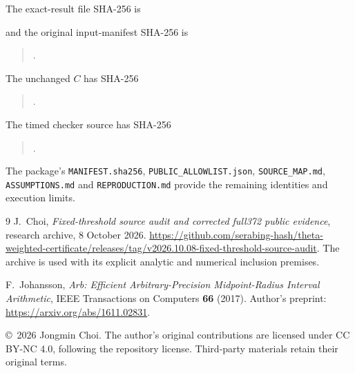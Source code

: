 \documentclass[11pt,a4paper]{article}
\theoremstyle{definition}
\theoremstyle{remark}
\numberwithin{equation}{section}
\begin{document}
The exact-result file SHA-256 is
\begin{quote}\small{}\end{quote}
and the original input-manifest SHA-256 is
\begin{quote}\small{}.\end{quote}
The unchanged \(C\) has SHA-256
\begin{quote}\small{}.\end{quote}
The timed checker source has SHA-256
\begin{quote}\small{}.\end{quote}
The package's \texttt{MANIFEST.sha256}, \texttt{PUBLIC\_ALLOWLIST.json},
\texttt{SOURCE\_MAP.md}, \texttt{ASSUMPTIONS.md} and
\texttt{REPRODUCTION.md} provide the remaining identities and execution limits.

\begin{thebibliography}{9}
J.~Choi,
\emph{Fixed-threshold source audit and corrected full372 public evidence},
research archive, 8 October 2026.
\url{https://github.com/serabing-hash/theta-weighted-certificate/releases/tag/v2026.10.08-fixed-threshold-source-audit}.
The archive is used with its explicit analytic and numerical inclusion premises.

F.~Johansson,
\emph{Arb: Efficient Arbitrary-Precision Midpoint-Radius Interval Arithmetic},
IEEE Transactions on Computers \textbf{66} (2017).
Author's preprint: \url{https://arxiv.org/abs/1611.02831}.
\end{thebibliography}

\medskip\noindent\small
\copyright\ 2026 Jongmin Choi. The author's original contributions are
licensed under CC BY-NC 4.0, following the repository license.
Third-party materials retain their original terms.
\end{document}
